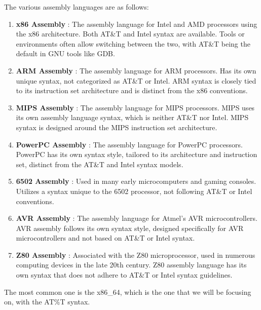 \documentclass{article}
\begin{document}
    \begin{example}
      The various assembly languages are as follows: 
      \begin{enumerate}
        \item \textbf{x86 Assembly} : The assembly language for Intel and AMD processors using the x86 architecture. Both AT\&T and Intel syntax are available. Tools or environments often allow switching between the two, with AT\&T being the default in GNU tools like GDB.
        
        \item \textbf{ARM Assembly} : The assembly language for ARM processors. Has its own unique syntax, not categorized as AT\&T or Intel. ARM syntax is closely tied to its instruction set architecture and is distinct from the x86 conventions.
        
        \item \textbf{MIPS Assembly} : The assembly language for MIPS processors. MIPS uses its own assembly language syntax, which is neither AT\&T nor Intel. MIPS syntax is designed around the MIPS instruction set architecture.
        
        \item \textbf{PowerPC Assembly} : The assembly language for PowerPC processors. PowerPC has its own syntax style, tailored to its architecture and instruction set, distinct from the AT\&T and Intel syntax models.
        
        \item \textbf{6502 Assembly} : Used in many early microcomputers and gaming consoles. Utilizes a syntax unique to the 6502 processor, not following AT\&T or Intel conventions.
        
        \item \textbf{AVR Assembly} : The assembly language for Atmel's AVR microcontrollers. AVR assembly follows its own syntax style, designed specifically for AVR microcontrollers and not based on AT\&T or Intel syntax.
        
        \item \textbf{Z80 Assembly} : Associated with the Z80 microprocessor, used in numerous computing devices in the late 20th century. Z80 assembly language has its own syntax that does not adhere to AT\&T or Intel syntax guidelines.
      \end{enumerate}
    \end{example}

    The most common one is the x86\_64, which is the one that we will be focusing on, with the AT\%T syntax. 
\end{document}

